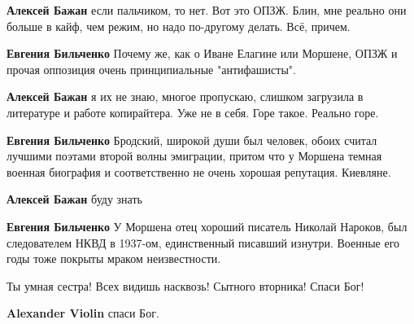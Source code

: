 \begin{itemize}
\begin{itemize} %
\textbf{Алексей Бажан} если пальчиком, то нет. Вот это ОПЗЖ. Блин, мне реально они больше в кайф, чем режим, но надо по-другому делать. Всё, причем.

\textbf{Евгения Бильченко} Почему же, как о Иване Елагине или Моршене, ОПЗЖ и прочая оппозиция очень принципиальные "антифашисты".

\textbf{Алексей Бажан} я их не знаю, многое пропускаю, слишком загрузила в литературе и работе копирайтера. Уже не в себя. Горе такое. Реально горе.

\textbf{Евгения Бильченко} Бродский, широкой души был человек, обоих считал лучшими поэтами второй волны эмиграции, притом что у Моршена темная военная биография и соответственно не очень хорошая репутация. Киевляне.

\textbf{Алексей Бажан} буду знать

\textbf{Евгения Бильченко} У Моршена отец хороший писатель Николай Нароков, был следователем НКВД в 1937-ом, единственный писавший изнутри. Военные его годы тоже покрыты мраком неизвестности.

\end{itemize} %


Ты умная сестра! Всех видишь насквозь! Сытного вторника! Спаси Бог!

\begin{itemize} %
\textbf{Alexander Violin} спаси Бог.
\end{itemize} %

\end{itemize} %
